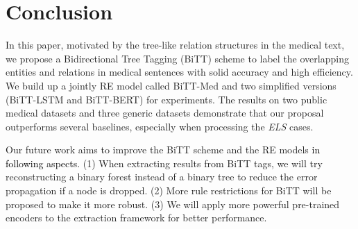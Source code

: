 \documentclass[conference]{IEEEtran}
\newcommand{\yankun}[1]{\textcolor{black}{#1}}
\begin{document}
%
 \section{Conclusion}
In this paper, motivated by the tree-like relation structures in the medical text, we propose a Bidirectional Tree Tagging (BiTT) scheme to label the overlapping entities and relations in medical sentences with solid accuracy and high efficiency. We build up a jointly RE model called BiTT-Med and two simplified versions (BiTT-LSTM and BiTT-BERT) for experiments. The results on two public medical datasets and three generic datasets demonstrate that our proposal outperforms several baselines, especially when processing the \emph{ELS} cases.

Our future work aims to improve the BiTT scheme and the RE models \yankun{in following aspects}. (1) When extracting results from BiTT tags, we will try reconstructing a binary forest instead of a binary tree to reduce the error propagation if a node is dropped. (2) More rule restrictions for BiTT will be proposed to make it more robust. (3) We will apply more powerful pre-trained encoders to the extraction framework for better performance.
\end{document}
